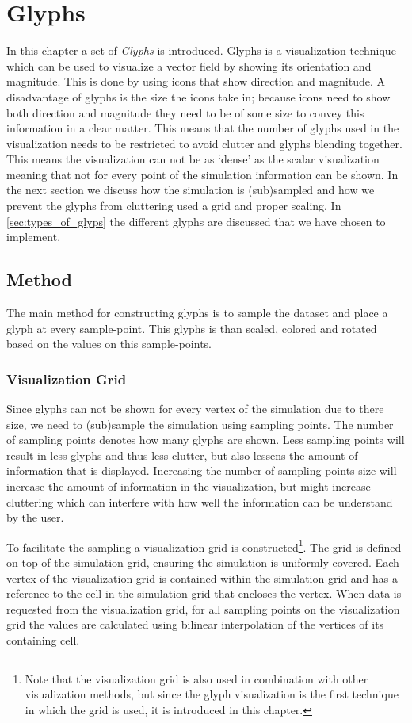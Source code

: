 \chapter{Glyphs} %
\label{cha:glyphs}
In this chapter a set of \emph{Glyphs} is introduced. Glyphs is a visualization technique which can be used to visualize a vector field by showing its orientation and magnitude. This is done by using icons that show direction and magnitude. A disadvantage of glyphs is the size the icons take in; because icons need to show both direction and magnitude they need to be of some size to convey this information in a clear matter. This means that the number of glyphs used in the visualization needs to be restricted to avoid clutter and glyphs blending together. This means the visualization can not be as `dense' as the scalar visualization meaning that not for every point of the simulation information can be shown. In the next section we discuss how the simulation is (sub)sampled and how we prevent the glyphs from cluttering used a grid and proper scaling. In \cref{sec:types_of_glyps} the different glyphs are discussed that we have chosen to implement.

\section{Method} %
\label{sec:method}
The main method for constructing glyphs is to sample the dataset and place a glyph at every sample-point. This glyphs is than scaled, colored and rotated based on the values on this sample-points. 

\subsection{Visualization Grid} %
\label{sub:sampling_grid}
Since glyphs can not be shown for every vertex of the simulation due to there size, we need to (sub)sample the simulation using sampling points. The number of sampling points denotes how many glyphs are shown. Less sampling points will result in less glyphs and thus less clutter, but also lessens the amount of information that is displayed. Increasing the number of sampling points size will increase the amount of information in the visualization, but might increase cluttering which can interfere with how well the information can be understand by the user. 

To facilitate the sampling a visualization grid is constructed\footnote{Note that the visualization grid is also used in combination with other visualization methods, but since the glyph visualization is the first technique in which the grid is used, it is introduced in this chapter.}.  The grid is defined on top of the simulation grid, ensuring the simulation is uniformly covered. Each vertex of the visualization grid is contained within the simulation grid and has a reference to the cell in the simulation grid that encloses the vertex. When data is requested from the visualization grid, for all sampling points on the visualization grid the values are calculated using bilinear interpolation of the vertices of its containing cell. 

